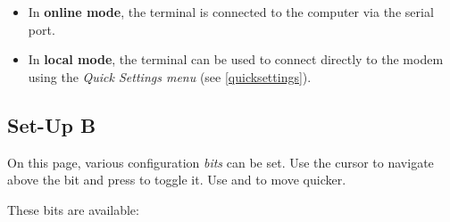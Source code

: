 \begin{itemize}[leftmargin=1em]
 \item In \textbf{online mode}, the terminal is connected to the computer via the serial port.\\
 \item In \textbf{local mode}, the terminal can be used to connect directly to the modem using the \textit{Quick Settings menu} (see \vref{quicksettings}).
\end{itemize}


\newpage
\subsection{Set-Up B}
\label{setupB}

On this page, various configuration \textit{bits} can be set. Use the cursor to navigate above the bit and press  to toggle it. Use \LKeyTab{} and \LKeyEnter{} to move quicker.

These bits are available:

